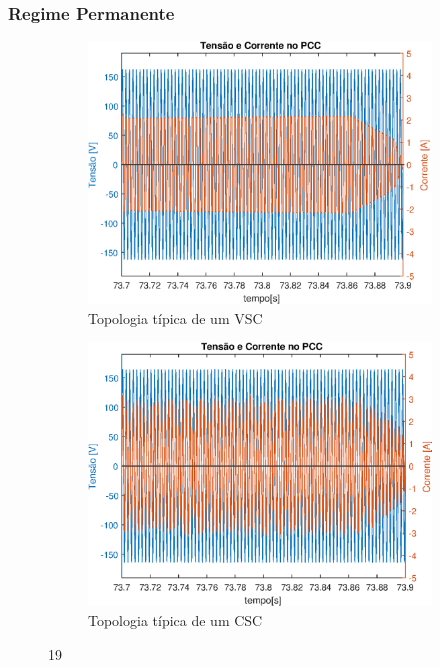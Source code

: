 \FloatBarrier

\subsubsection{Regime Permanente}

\begin{figure}[!htb] %
	\centering
	\begin{subfigure}[b]{0.48\textwidth}
		\centering
		\includegraphics[width=\textwidth]{Cap4/Figuras/resultados_unfilt_19.eps}
		\caption{Topologia típica de um VSC} 
		\label{fig:resultados_unfilt_19.eps}
	\end{subfigure}%
		\hfill
	\begin{subfigure}[b]{0.48\textwidth}  
		\centering 
		\includegraphics[width=\textwidth]{Cap4/Figuras/resultados_filt_19.eps}
		\caption{Topologia típica de um CSC}    
		\label{fig:resultados_filt_19.eps}
	\end{subfigure}%
	\caption{19}
	\label{fig:19}
\end{figure}

